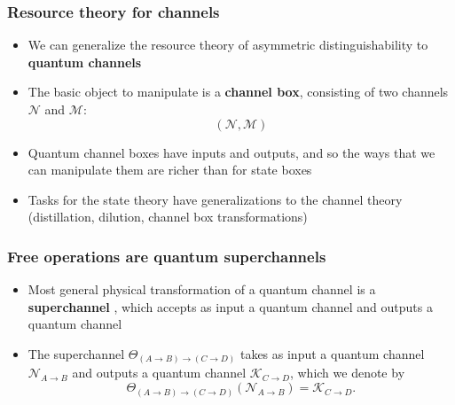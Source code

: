 \documentclass[usenames,dvipsnames,handout]{beamer}
\begin{document}
\begin{frame}
\frametitle{Resource theory for channels}

\begin{itemize}

\pause
\item We can generalize the resource theory of asymmetric distinguishability to {\color{MidnightBlue}\textbf{quantum channels}}

\vspace{.1in}

\pause
\item The basic object to manipulate is a {\color{MidnightBlue}\textbf{channel box}}, consisting of two channels $\mathcal{N}$ and $\mathcal{M}$:
$$
(\mathcal{N},\mathcal{M})
$$

\pause
\vspace{.1in}
\item Quantum channel boxes have inputs and outputs, and so the ways that we can manipulate them are richer than for state boxes

\pause
\vspace{.1in}
\item Tasks for the state theory have generalizations to the channel theory (distillation, dilution, channel box transformations)

\end{itemize}

\end{frame}


\begin{frame}
\frametitle{Free operations are quantum superchannels}

\begin{itemize}

\pause
\item Most general physical transformation of a quantum channel is  a {\color{MidnightBlue}\textbf{superchannel}} \cite{CDP08}, which accepts as input a quantum channel and outputs a quantum channel

\pause
\vspace{.2in}
\item The superchannel $\Theta_{\left(  A\rightarrow B\right)
\rightarrow\left(  C\rightarrow D\right)  }$ takes as input a quantum channel
$\mathcal{N}_{A\rightarrow B}$ and outputs a quantum channel $\mathcal{K}%
_{C\rightarrow D}$, which we denote by%
$$
\Theta_{\left(  A\rightarrow B\right)  \rightarrow\left(  C\rightarrow
D\right)  }(\mathcal{N}_{A\rightarrow B})=\mathcal{K}_{C\rightarrow D}.
$$

\end{itemize}

\end{frame}
\end{document}
